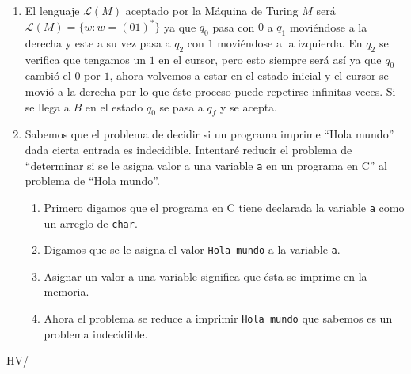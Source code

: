\documentclass[spanish, fleqn]{article}
\begin{document}
\begin{enumerate}
	\item
		El lenguaje $\mathcal{L}(M)$ aceptado por la Máquina de Turing $M$ será
		$\mathcal{L}(M)= \{w:w=(01)^*\}$ ya que $q_0$ pasa con $0$ a $q_1$
		moviéndose a la derecha y este a su vez pasa a $q_2$ con $1$ moviéndose
		a la izquierda. En $q_2$ se verifica que tengamos un $1$ en el cursor,
		pero esto siempre será así ya que $q_0$ cambió el $0$ por $1$, ahora
		volvemos a estar en el estado inicial y el cursor se movió a la derecha
		por lo que éste proceso puede repetirse infinitas veces. Si se llega a
		$B$ en el estado $q_0$ se pasa a $q_f$ y se acepta.
	\item
		Sabemos que el problema de decidir si un programa imprime ``Hola
		mundo'' dada cierta entrada es indecidible. Intentaré reducir el
		problema de ``determinar si se le asigna valor a una variable
		\texttt{a} en un programa en C'' al problema de ``Hola mundo''.
		\begin{enumerate}
			\item
				Primero digamos que el programa en C tiene declarada la
				variable \texttt{a} como un arreglo de \texttt{char}.
			\item
				Digamos que se le asigna el valor \texttt{Hola mundo} a la 
				variable \texttt{a}.
			\item
				Asignar un valor a una variable significa que ésta se imprime
				en la memoria.
			\item
				Ahora el problema se reduce a imprimir \texttt{Hola mundo} que
				sabemos es un problema indecidible.
		\end{enumerate}

\end{enumerate}

\vfill\hfill HV/\LaTeXe
\end{document}

